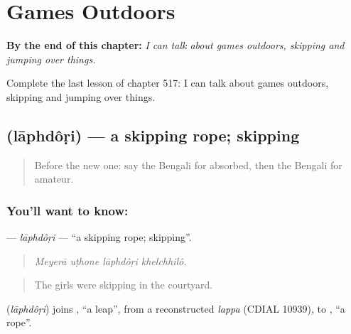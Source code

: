 
\chapter{Games Outdoors}
\label{ch:bn-games-outdoors}

\begin{chapteropening}
\textbf{By the end of this chapter:} \emph{I can talk about games outdoors, skipping and jumping over things.}

Complete the last lesson of chapter 517: I can talk about games outdoors, skipping and jumping over things.
\end{chapteropening}

\section[\texorpdfstring{\bn{লাফদড়ি} (lāphdôṛi)}{লাফদড়ি (lāphdôṛi)}]{ (lāphdôṛi) — a skipping rope; skipping}

\label{lesson:BN-C517-laphdori}



\begin{quote}
Before the new one: say the Bengali for absorbed, then the Bengali for amateur.
\end{quote}

\subsection*{You'll want to know: }
\textbf{} — \emph{lāphdôṛi} — \textquotedblleft{}a skipping rope; skipping\textquotedblright{}.

\begin{quote}
   
\end{quote}

\begin{quote}
\emph{Meyerā uṭhone lāphdôṛi khelchhilô.}
\end{quote}

\begin{quote}
The girls were skipping in the courtyard.
\end{quote}

\begin{cousinweb}
\textbf{} (\emph{lāphdôṛi}) joins , \textquotedblleft{}a leap\textquotedblright{}, from a reconstructed \emph{lappa} (CDIAL 10939), to , \textquotedblleft{}a rope\textquotedblright{}.
\end{cousinweb}

